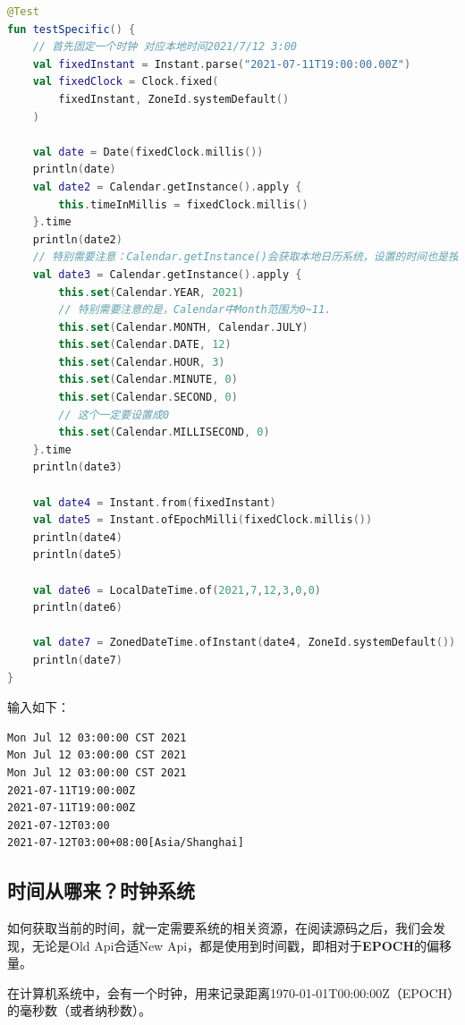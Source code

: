\documentclass[cn,10pt,math=newtx,citestyle=gb7714-2015,bibstyle=gb7714-2015]{elegantbook}
\begin{document}
    \begin{lstlisting}[language=Kotlin]
@Test
fun testSpecific() {
    // 首先固定一个时钟 对应本地时间2021/7/12 3:00
    val fixedInstant = Instant.parse("2021-07-11T19:00:00.00Z")
    val fixedClock = Clock.fixed(
        fixedInstant, ZoneId.systemDefault()
    )

    val date = Date(fixedClock.millis())
    println(date)
    val date2 = Calendar.getInstance().apply {
        this.timeInMillis = fixedClock.millis()
    }.time
    println(date2)
    // 特别需要注意：Calendar.getInstance()会获取本地日历系统，设置的时间也是按照本地时间来设置的。
    val date3 = Calendar.getInstance().apply {
        this.set(Calendar.YEAR, 2021)
        // 特别需要注意的是，Calendar中Month范围为0~11.
        this.set(Calendar.MONTH, Calendar.JULY)
        this.set(Calendar.DATE, 12)
        this.set(Calendar.HOUR, 3)
        this.set(Calendar.MINUTE, 0)
        this.set(Calendar.SECOND, 0)
        // 这个一定要设置成0
        this.set(Calendar.MILLISECOND, 0)
    }.time
    println(date3)

    val date4 = Instant.from(fixedInstant)
    val date5 = Instant.ofEpochMilli(fixedClock.millis())
    println(date4)
    println(date5)

    val date6 = LocalDateTime.of(2021,7,12,3,0,0)
    println(date6)

    val date7 = ZonedDateTime.ofInstant(date4, ZoneId.systemDefault())
    println(date7)
}
    \end{lstlisting}

    输入如下：

    \begin{lstlisting}[]
Mon Jul 12 03:00:00 CST 2021
Mon Jul 12 03:00:00 CST 2021
Mon Jul 12 03:00:00 CST 2021
2021-07-11T19:00:00Z
2021-07-11T19:00:00Z
2021-07-12T03:00
2021-07-12T03:00+08:00[Asia/Shanghai]
    \end{lstlisting}

    \subsection{时间从哪来？时钟系统}

    如何获取当前的时间，就一定需要系统的相关资源，在阅读源码之后，我们会发现，无论是Old Api合适New Api，都是使用到时间戳，即相对于\textbf{EPOCH}的偏移量。

    \begin{note}
        在计算机系统中，会有一个时钟，用来记录距离1970-01-01T00:00:00Z（EPOCH）的毫秒数（或者纳秒数）。
    \end{note}
\end{document}
